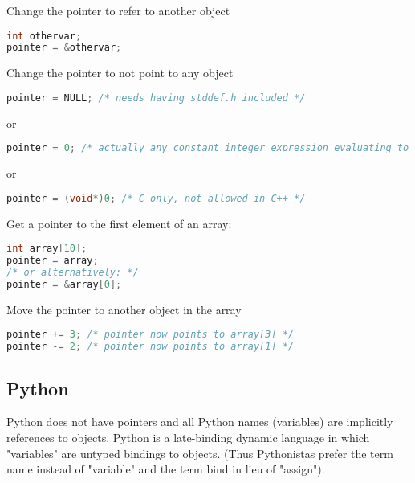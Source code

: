 \documentclass[12pt]{book}
\begin{document}
Change the pointer to refer to another object

\lstset{style=mystyle}
\begin{lstlisting}[language=C++, caption=C++ example]
int othervar;
pointer = &othervar;
\end{lstlisting}

Change the pointer to not point to any object

\lstset{style=mystyle}
\begin{lstlisting}[language=C++, caption=C++ example]
pointer = NULL; /* needs having stddef.h included */
\end{lstlisting}

or

\lstset{style=mystyle}
\begin{lstlisting}[language=C++, caption=C++ example]
pointer = 0; /* actually any constant integer expression evaluating to 0 could be used, e.g. (1-1) will work as well */
\end{lstlisting}


or 

\lstset{style=mystyle}
\begin{lstlisting}[language=C++, caption=C++ example]
pointer = (void*)0; /* C only, not allowed in C++ */
\end{lstlisting}


Get a pointer to the first element of an array:

\lstset{style=mystyle}
\begin{lstlisting}[language=C++, caption=C++ example]
int array[10];
pointer = array;
/* or alternatively: */
pointer = &array[0];
\end{lstlisting}


Move the pointer to another object in the array

\lstset{style=mystyle}
\begin{lstlisting}[language=C++, caption=C++ example]
pointer += 3; /* pointer now points to array[3] */
pointer -= 2; /* pointer now points to array[1] */
\end{lstlisting}

\subsection{Python}

Python does not have pointers and all Python names (variables) are implicitly references to objects. Python is a late-binding dynamic language in which "variables" are untyped bindings to objects. (Thus Pythonistas prefer the term name instead of "variable" and the term bind in lieu of "assign").
\end{document}
